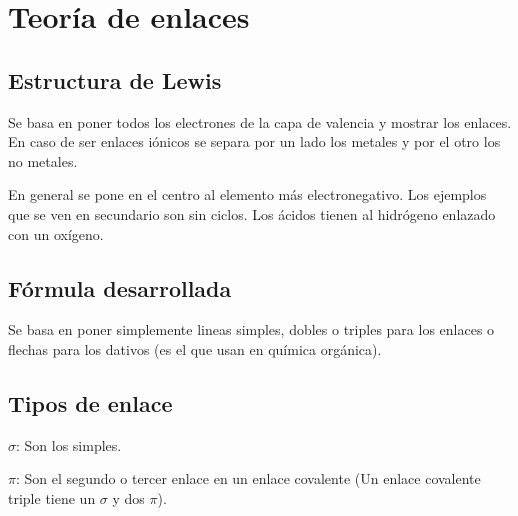\section{Teoría de enlaces}


\subsection*{Estructura de Lewis}

Se basa en poner todos los electrones de la capa de valencia y mostrar los enlaces. En caso de ser enlaces iónicos se separa por un lado los metales y por el otro los no metales.

En general se pone en el centro al elemento más electronegativo. Los ejemplos que se ven en secundario son sin ciclos. Los ácidos tienen al hidrógeno enlazado con un oxígeno. 


\subsection*{Fórmula desarrollada}

Se basa en poner simplemente lineas simples, dobles o triples para los enlaces o flechas para los dativos (es el que usan en química orgánica).

\subsection*{Tipos de enlace}

$\sigma$: Son los simples.

$\pi$: Son el segundo o tercer enlace en un enlace covalente (Un enlace covalente triple tiene un $\sigma$ y dos $\pi$).
